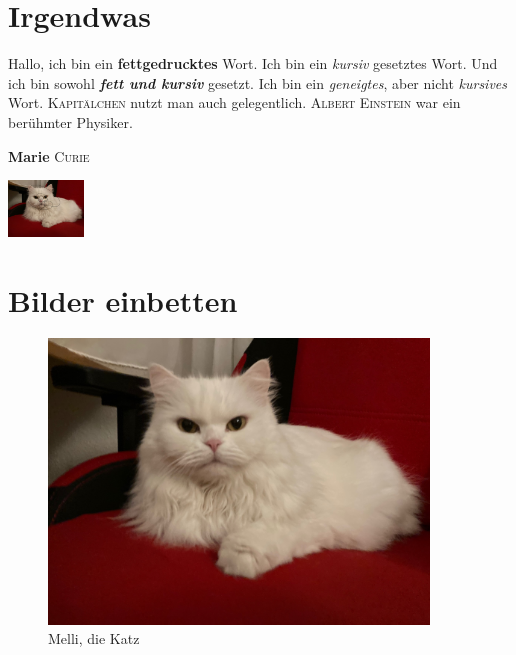 \documentclass[12pt,ngerman,parskip=half]{scrreprt}
\newcommand{\physiker}[1]{\textcolor{FUH}{\textsc{#1}}}
\newcommand{\Physiker}[2]{\textcolor{fuh}{\textbf{#1} \textsc{#2}}}
\begin{document}
\blindtext[1] 

\chapter{Irgendwas}

Hallo, ich bin ein \textbf{fettgedrucktes} Wort. Ich bin ein \textit{kursiv} gesetztes Wort. Und ich bin sowohl \textbf{\textit{fett und kursiv}} gesetzt. Ich bin ein \textsl{geneigtes}, aber nicht \textit{kursives} Wort. \textsc{Kapitälchen} nutzt man auch gelegentlich. \physiker{Albert Einstein} war ein berühmter Physiker.

\Physiker{Marie}{Curie}

\includegraphics[width=2cm]{./Bilder/Katze} %


\chapter{Bilder einbetten}

\blindtext

\begin{figure}[h] %
\begin{center} %
\includegraphics[width=0.9\textwidth]{./Bilder/Katze.jpg} %
\caption{Melli, die Katz}
\end{center}
\end{figure}
\end{document}
